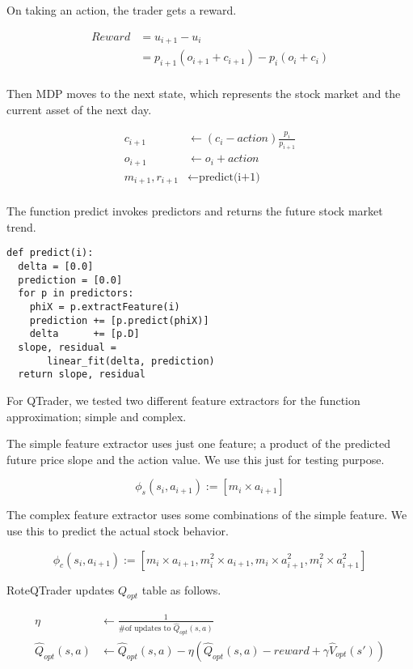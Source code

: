 \documentclass[twocolumn,10pt]{asme2ej}
\begin{document}
On taking an action, the trader gets a reward.

\begin{align*}
  Reward &= u_{i+1} - u_{i} \\
  &=p_{i+1}(o_{i+1} + c_{i+1}) - p_{i}(o_{i} + c_{i}) \\
\end{align*}

Then MDP moves to the next state, which represents the stock market and the current asset of the next day.

\begin{align*}
  c_{i+1} &\gets (c_{i} - action)\frac{p_i}{p_{i+1}} \\
  o_{i+1} &\gets o_{i} + action \\
  m_{i+1}, r_{i+1} &\gets \text{predict(i+1)} \\
\end{align*}

The function predict invokes predictors and returns the future stock market trend.

\begin{verbatim}
def predict(i):
  delta = [0.0]
  prediction = [0.0]
  for p in predictors:
    phiX = p.extractFeature(i)
    prediction += [p.predict(phiX)]
    delta      += [p.D]
  slope, residual = 
       linear_fit(delta, prediction)
  return slope, residual
\end{verbatim}

For QTrader, we tested two different feature extractors for the function approximation; simple and complex.

The simple feature extractor uses just one feature; a product of the predicted
future price slope and the action value. We use this just for testing purpose.

\[
\phi_s(s_i,a_{i+1}) := [m_i \times a_{i+1}]
\]

The complex feature extractor uses some combinations of the simple feature. We
use this to predict the actual stock behavior.

\[
\phi_c(s_i,a_{i+1}) := [m_i \times a_{i+1}, m_i^2 \times a_{i+1}, m_i \times a_{i+1}^2, m_i^2 \times a_{i+1}^2 ]
\]

RoteQTrader updates $Q_{opt}$ table as follows.

\begin{align*}
  \eta &\gets \frac{1}{\text{\# of updates to }\hat{Q}_{opt}(s, a)} \\
  \hat{Q}_{opt}(s, a)&\gets \hat{Q}_{opt}(s, a) - \eta\left(\hat{Q}_{opt}(s, a) - reward + \gamma \hat{V}_{opt}(s')\right)
\end{align*}
\end{document}
